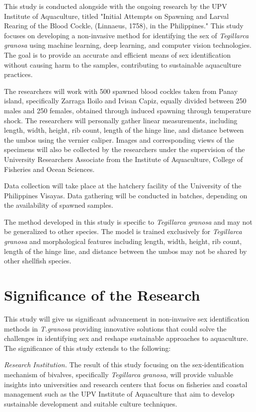 This study is conducted alongside with the ongoing research by the UPV Institute of Aquaculture, titled "Initial Attempts on Spawning and Larval Rearing of the Blood Cockle, \Tegillarcagranosa (Linnaeus, 1758), in the Philippines." This study focuses on developing a non-invasive method for identifying the sex of \textit{Tegillarca granosa} using machine learning, deep learning, and computer vision technologies. The goal is to provide an accurate and efficient means of sex identification without causing harm to the samples, contributing to sustainable aquaculture practices.

The researchers will work with 500 spawned blood cockles taken from Panay island, specifically Zarraga Iloilo and Ivisan Capiz, equally divided between 250 males and 250 females, obtained through induced spawning through temperature shock. The researchers will personally gather linear measurements, including length, width, height, rib count, length of the hinge line, and distance between the umbos using the vernier caliper. Images and corresponding views of the specimens will also be collected by the researchers under the supervision of the University Researchers Associate from the Institute of Aquaculture, College of Fisheries and Ocean Sciences.

Data collection will take place at the hatchery facility of the University of the Philippines Visayas. Data gathering will be conducted in batches, depending on the availability of spawned samples.

The method developed in this study is specific to \textit{Tegillarca granosa} and may not be generalized to other species. The model is trained exclusively for \textit{Tegillarca granosa} and  morphological features including length, width, height, rib count, length of the hinge line, and distance between the umbos may not be shared by other shellfish species. 

\section{Significance of the Research}
\label{sec:significance}

This study will give us significant advancement in non-invasive sex identification methods in \textit{T.granosa} providing innovative solutions that could solve the challenges in identifying sex  and reshape sustainable approaches to aquaculture. The significance of this study extends to the following:

 \textit{Research Institution.} The result of this study focusing on the sex-identification mechanism of bivalves, specifically \textit{Tegillarca granosa}, will provide valuable insights into universities and research centers that focus on fisheries and coastal management such as the UPV Institute of Aquaculture that aim to develop sustainable development and suitable culture techniques.


